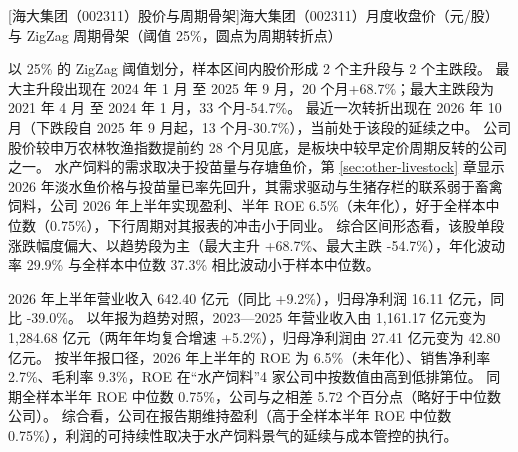 \begin{center}
\begin{minipage}{\textwidth}\centering
{}

[海大集团（002311）股价与周期骨架]{海大集团（002311）月度收盘价（元/股）与 ZigZag 周期骨架（阈值 25\%，圆点为周期转折点）}
\end{minipage}
\end{center}

 以 25\% 的 ZigZag 阈值划分，样本区间内股价形成 2 个主升段与 2 个主跌段。 最大主升段出现在 2024 年 1 月 至 2025 年 9 月，20 个月+68.7\%；最大主跌段为 2021 年 4 月 至 2024 年 1 月，33 个月-54.7\%。 最近一次转折出现在 2026 年 10 月（下跌段自 2025 年 9 月起，13 个月-30.7\%），当前处于该段的延续之中。 公司股价较申万农林牧渔指数提前约 28 个月见底，是板块中较早定价周期反转的公司之一。 水产饲料的需求取决于投苗量与存塘鱼价，第 \ref{sec:other-livestock} 章显示 2026 年淡水鱼价格与投苗量已率先回升，其需求驱动与生猪存栏的联系弱于畜禽饲料，公司 2026 年上半年实现盈利、半年 ROE 6.5\%（未年化），好于全样本中位数（0.75\%），下行周期对其报表的冲击小于同业。 综合区间形态看，该股单段涨跌幅度偏大、以趋势段为主（最大主升 +68.7\%、最大主跌 -54.7\%），年化波动率 29.9\% 与全样本中位数 37.3\% 相比波动小于样本中位数。

 2026 年上半年营业收入 642.40 亿元（同比 +9.2\%），归母净利润 16.11 亿元，同比 -39.0\%。 以年报为趋势对照，2023---2025 年营业收入由 1,161.17 亿元变为 1,284.68 亿元（两年年均复合增速 +5.2\%），归母净利润由 27.41 亿元变为 42.80 亿元。 按半年报口径，2026 年上半年的 ROE 为 6.5\%（未年化）、销售净利率 2.7\%、毛利率 9.3\%，ROE 在“水产饲料”4 家公司中按数值由高到低排第位。 同期全样本半年 ROE 中位数 0.75\%，公司与之相差 5.72 个百分点（略好于中位数公司）。 综合看，公司在报告期维持盈利（高于全样本半年 ROE 中位数 0.75\%），利润的可持续性取决于水产饲料景气的延续与成本管控的执行。

